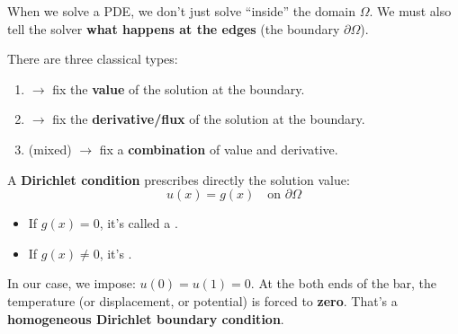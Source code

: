 \highspace
\begin{deepeningbox}
    When we solve a PDE, we don't just solve ``inside'' the domain $\Omega$. We must also tell the solver \textbf{what happens at the edges} (the boundary $\partial \Omega$).

    There are three classical types:
    \begin{enumerate}
        \item {} $\rightarrow$ fix the \textbf{value} of the solution at the boundary.
        \item {} $\rightarrow$ fix the \textbf{derivative/flux} of the solution at the boundary.
        \item {} (mixed) $\rightarrow$ fix a \textbf{combination} of value and derivative.
    \end{enumerate}
    A \textbf{Dirichlet condition} prescribes directly the solution value:
    \begin{equation}
        u(x) = g(x) \quad \text{on } \partial\Omega
    \end{equation}
    \begin{itemize}
        \item If $g(x) = 0$, it's called a .
        \item If $g(x) \neq 0$, it's .
    \end{itemize}
    In our case, we impose: $u(0) = u(1) = 0$. At the both ends of the bar, the temperature (or displacement, or potential) is forced to \textbf{zero}. That's a \textbf{homogeneous Dirichlet boundary condition}.
\end{deepeningbox}

\newpage

